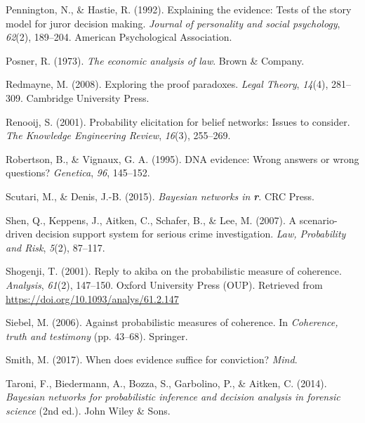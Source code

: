 \documentclass[11pt,dvipsnames,enabledeprecatedfontcommands]{scrartcl}
\begin{document}
\leavevmode\hypertarget{ref-pennington1992explaining}{}%
Pennington, N., \& Hastie, R. (1992). Explaining the evidence: Tests of
the story model for juror decision making. \emph{Journal of personality
and social psychology}, \emph{62}(2), 189--204. American Psychological
Association.

\leavevmode\hypertarget{ref-Posner1973}{}%
Posner, R. (1973). \emph{The economic analysis of law}. Brown \&
Company.

\leavevmode\hypertarget{ref-redmayne2008exploring}{}%
Redmayne, M. (2008). Exploring the proof paradoxes. \emph{Legal Theory},
\emph{14}(4), 281--309. Cambridge University Press.

\leavevmode\hypertarget{ref-renooij2001ProbabilityElicitationBeliefa}{}%
Renooij, S. (2001). Probability elicitation for belief networks: Issues
to consider. \emph{The Knowledge Engineering Review}, \emph{16}(3),
255--269.

\leavevmode\hypertarget{ref-Robertson1995evidence}{}%
Robertson, B., \& Vignaux, G. A. (1995). DNA evidence: Wrong answers or
wrong questions? \emph{Genetica}, \emph{96}, 145--152.

\leavevmode\hypertarget{ref-Scutari2015Bayesian-Networ}{}%
Scutari, M., \& Denis, J.-B. (2015). \emph{Bayesian networks in
\textbf{{r}}}. CRC Press.

\leavevmode\hypertarget{ref-shen2007ScenariodrivenDecisionSupporta}{}%
Shen, Q., Keppens, J., Aitken, C., Schafer, B., \& Lee, M. (2007). A
scenario-driven decision support system for serious crime investigation.
\emph{Law, Probability and Risk}, \emph{5}(2), 87--117.

\leavevmode\hypertarget{ref-Shogenji2001Reply}{}%
Shogenji, T. (2001). Reply to akiba on the probabilistic measure of
coherence. \emph{Analysis}, \emph{61}(2), 147--150. Oxford University
Press (OUP). Retrieved from
\url{https://doi.org/10.1093/analys/61.2.147}

\leavevmode\hypertarget{ref-siebel2006against}{}%
Siebel, M. (2006). Against probabilistic measures of coherence. In
\emph{Coherence, truth and testimony} (pp. 43--68). Springer.

\leavevmode\hypertarget{ref-Smith_conviction_mind_2017}{}%
Smith, M. (2017). When does evidence suffice for conviction?
\emph{Mind}.

\leavevmode\hypertarget{ref-taroni2006bayesian}{}%
Taroni, F., Biedermann, A., Bozza, S., Garbolino, P., \& Aitken, C.
(2014). \emph{Bayesian networks for probabilistic inference and decision
analysis in forensic science} (2nd ed.). John Wiley \& Sons.
\end{document}
